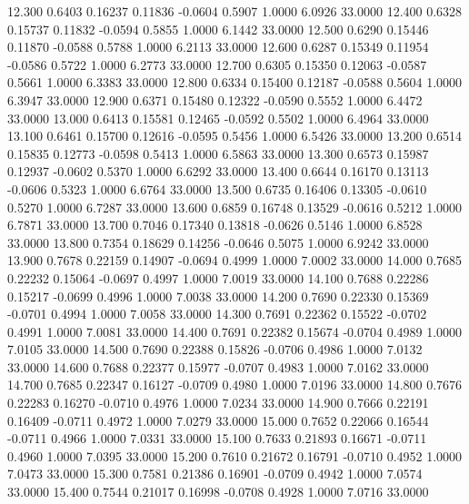  12.300   0.6403   0.16237   0.11836  -0.0604   0.5907   1.0000   6.0926  33.0000
  12.400   0.6328   0.15737   0.11832  -0.0594   0.5855   1.0000   6.1442  33.0000
  12.500   0.6290   0.15446   0.11870  -0.0588   0.5788   1.0000   6.2113  33.0000
  12.600   0.6287   0.15349   0.11954  -0.0586   0.5722   1.0000   6.2773  33.0000
  12.700   0.6305   0.15350   0.12063  -0.0587   0.5661   1.0000   6.3383  33.0000
  12.800   0.6334   0.15400   0.12187  -0.0588   0.5604   1.0000   6.3947  33.0000
  12.900   0.6371   0.15480   0.12322  -0.0590   0.5552   1.0000   6.4472  33.0000
  13.000   0.6413   0.15581   0.12465  -0.0592   0.5502   1.0000   6.4964  33.0000
  13.100   0.6461   0.15700   0.12616  -0.0595   0.5456   1.0000   6.5426  33.0000
  13.200   0.6514   0.15835   0.12773  -0.0598   0.5413   1.0000   6.5863  33.0000
  13.300   0.6573   0.15987   0.12937  -0.0602   0.5370   1.0000   6.6292  33.0000
  13.400   0.6644   0.16170   0.13113  -0.0606   0.5323   1.0000   6.6764  33.0000
  13.500   0.6735   0.16406   0.13305  -0.0610   0.5270   1.0000   6.7287  33.0000
  13.600   0.6859   0.16748   0.13529  -0.0616   0.5212   1.0000   6.7871  33.0000
  13.700   0.7046   0.17340   0.13818  -0.0626   0.5146   1.0000   6.8528  33.0000
  13.800   0.7354   0.18629   0.14256  -0.0646   0.5075   1.0000   6.9242  33.0000
  13.900   0.7678   0.22159   0.14907  -0.0694   0.4999   1.0000   7.0002  33.0000
  14.000   0.7685   0.22232   0.15064  -0.0697   0.4997   1.0000   7.0019  33.0000
  14.100   0.7688   0.22286   0.15217  -0.0699   0.4996   1.0000   7.0038  33.0000
  14.200   0.7690   0.22330   0.15369  -0.0701   0.4994   1.0000   7.0058  33.0000
  14.300   0.7691   0.22362   0.15522  -0.0702   0.4991   1.0000   7.0081  33.0000
  14.400   0.7691   0.22382   0.15674  -0.0704   0.4989   1.0000   7.0105  33.0000
  14.500   0.7690   0.22388   0.15826  -0.0706   0.4986   1.0000   7.0132  33.0000
  14.600   0.7688   0.22377   0.15977  -0.0707   0.4983   1.0000   7.0162  33.0000
  14.700   0.7685   0.22347   0.16127  -0.0709   0.4980   1.0000   7.0196  33.0000
  14.800   0.7676   0.22283   0.16270  -0.0710   0.4976   1.0000   7.0234  33.0000
  14.900   0.7666   0.22191   0.16409  -0.0711   0.4972   1.0000   7.0279  33.0000
  15.000   0.7652   0.22066   0.16544  -0.0711   0.4966   1.0000   7.0331  33.0000
  15.100   0.7633   0.21893   0.16671  -0.0711   0.4960   1.0000   7.0395  33.0000
  15.200   0.7610   0.21672   0.16791  -0.0710   0.4952   1.0000   7.0473  33.0000
  15.300   0.7581   0.21386   0.16901  -0.0709   0.4942   1.0000   7.0574  33.0000
  15.400   0.7544   0.21017   0.16998  -0.0708   0.4928   1.0000   7.0716  33.0000
